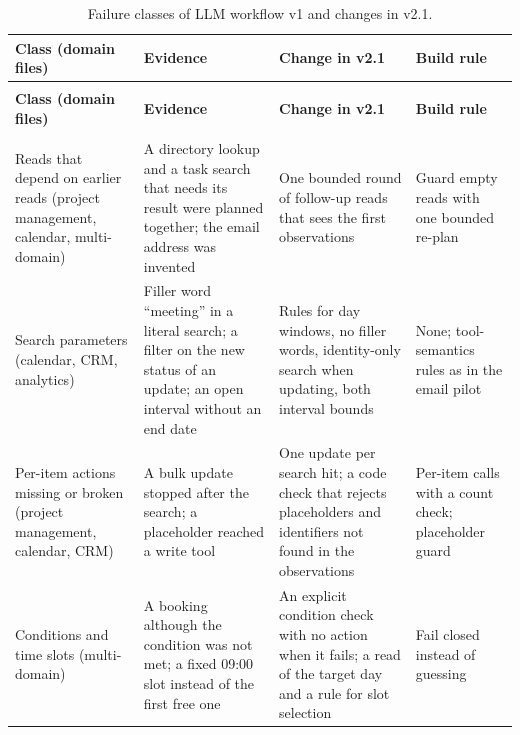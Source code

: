 \begingroup
\renewcommand{\baselinestretch}{1}
\small
\setlength{\tabcolsep}{4pt}
\renewcommand{\arraystretch}{1.08}
\begin{longtable}{>{\raggedright\arraybackslash}p{} >{\raggedright\arraybackslash}p{} >{\raggedright\arraybackslash}p{} >{\raggedright\arraybackslash}p{}}
\caption[Evalaution 2: Failure classes of LLM workflow v1 and changes in v2.1]{Failure classes of LLM workflow v1 and changes in v2.1.}\label{tab:app-eval2-failures} \\
\toprule
\textbf{Class (domain files)} & \textbf{Evidence} & \textbf{Change in v2.1} & \textbf{Build rule} \\
\midrule
\endfirsthead
\multicolumn{4}{l}{\tablename~\thetable{} (continued)} \\
\toprule
\textbf{Class (domain files)} & \textbf{Evidence} & \textbf{Change in v2.1} & \textbf{Build rule} \\
\midrule
\endhead
\midrule
\multicolumn{4}{r}{\emph{Continued on the next page.}} \\
\endfoot
\bottomrule
\endlastfoot
1 Reads that depend on earlier reads (project management, calendar, multi-domain) & A directory lookup and a task search that needs its result were planned together; the email address was invented & One bounded round of follow-up reads that sees the first observations & Guard empty reads with one bounded re-plan \\
\addlinespace[2.5pt]
2 Search parameters (calendar, CRM, analytics) & Filler word ``meeting'' in a literal search; a filter on the new status of an update; an open interval without an end date & Rules for day windows, no filler words, identity-only search when updating, both interval bounds & None; tool-semantics rules as in the email pilot \\
\addlinespace[2.5pt]
3 Per-item actions missing or broken (project management, calendar, CRM) & A bulk update stopped after the search; a placeholder reached a write tool & One update per search hit; a code check that rejects placeholders and identifiers not found in the observations & Per-item calls with a count check; placeholder guard \\
\addlinespace[2.5pt]
4 Conditions and time slots (multi-domain) & A booking although the condition was not met; a fixed 09:00 slot instead of the first free one & An explicit condition check with no action when it fails; a read of the target day and a rule for slot selection & Fail closed instead of guessing \\
\end{longtable}
\endgroup

